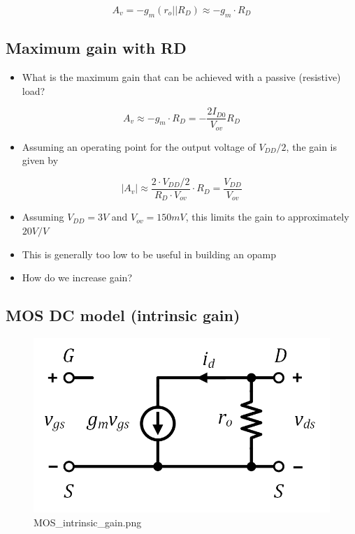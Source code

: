 \documentclass[11pt]{article}
\providecommand{\tightlist}{%
      \setlength{\itemsep}{0pt}\setlength{\parskip}{0pt}}
\begin{document}
\begin{equation}
\boxed{A_v = -g_m(r_o||R_D) \approx -g_m\cdot R_D}
\end{equation}

    \hypertarget{maximum-gain-with-rd}{%
\subsection{Maximum gain with RD}\label{maximum-gain-with-rd}}

    \begin{itemize}
\tightlist
\item
  What is the maximum gain that can be achieved with a passive
  (resistive) load?
\end{itemize}

\begin{equation}
A_v \approx -g_m\cdot R_D = -\dfrac{2I_{D0}}{V_{ov}}R_D
\end{equation}

\begin{itemize}
\tightlist
\item
  Assuming an operating point for the output voltage of \(V_{DD}/2\),
  the gain is given by
\end{itemize}

\begin{equation}
|A_v| \approx \dfrac{2\cdot V_{DD}/2}{R_D\cdot V_{ov}}\cdot R_D = \dfrac{V_{DD}}{V_{ov}}
\end{equation}

\begin{itemize}
\tightlist
\item
  Assuming \(V_{DD} = 3V\) and \(V_{ov} = 150mV\), this limits the gain
  to approximately \(20V/V\)
\item
  This is generally too low to be useful in building an opamp
\item
  How do we increase gain?
\end{itemize}

    \hypertarget{mos-dc-model-intrinsic-gain}{%
\subsection{MOS DC model (intrinsic
gain)}\label{mos-dc-model-intrinsic-gain}}

    \begin{figure}
\centering
\includegraphics{MOS_intrinsic_gain.png}
\caption{MOS\_intrinsic\_gain.png}
\end{figure}
\end{document}
